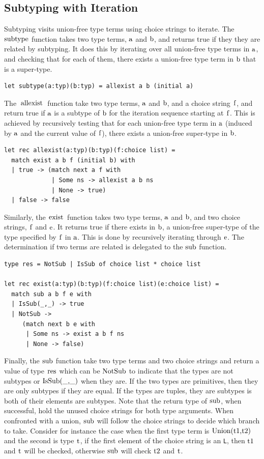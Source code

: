 \documentclass[a4paper,english]{lipics-v2019}
\renewcommand{\L}{{\tt L}\xspace}
\renewcommand{\c}[1]{\ensuremath{\text{\lstinline{#1}}}\xspace}
\begin{document}
\subsection{Subtyping with Iteration}

Subtyping visits union-free type terms using choice strings to iterate.  The
\c{subtype} function takes two type terms, \c a and \c b, and returns true
if they they are related by subtyping. It does this by iterating over all
union-free type terms in \c a, and checking that for each of them, there
exists a union-free type term in \c b that is a super-type.

\begin{lstlisting}
let subtype(a:typ)(b:typ) = allexist a b (initial a)
\end{lstlisting}

The \c{allexist} function take two type terms, \c a and \c b, and a choice
string \c f, and return true if \c a is a subtype of \c b for the iteration
sequence starting at \c f. This is achieved by recursively testing that for
each union-free type term in \c a (induced by \c a and the current value of
\c f), there exists a union-free super-type in \c b.

\begin{lstlisting}
let rec allexist(a:typ)(b:typ)(f:choice list) =
  match exist a b f (initial b) with 
  | true -> (match next a f with
             | Some ns -> allexist a b ns 
             | None -> true) 
  | false -> false
\end{lstlisting}

Similarly, the \c{exist} function takes two type terms, \c a and \c b, and
two choice strings, \c f and \c e. It returns true if there exists in \c b, a
union-free super-type of the type specified by \c f in \c a. This is done by
recursively iterating through \c e. The determination if two terms are
related is delegated to the \c{sub} function.

\begin{lstlisting}
type res = NotSub | IsSub of choice list * choice list

let rec exist(a:typ)(b:typ)(f:choice list)(e:choice list) =
  match sub a b f e with 
  | IsSub(_,_) -> true 
  | NotSub -> 
     (match next b e with
      | Some ns -> exist a b f ns 
      | None -> false) 
\end{lstlisting}

Finally, the \c{sub} function take two type terms and two choice strings and
return a value of type \c{res} which can be \c{NotSub} to indicate that the
types are not subtypes or \c{IsSub(_,_)} when they are.  If the two types
are primitives, then they are only subtypes if they are equal.  If the types
are tuples, they are subtypes is both of their elements are subtypes. Note
that the return type of \c{sub}, when successful, hold the unused choice
strings for both type arguments. When confronted with a union, \c{sub} will
follow the choice strings to decide which branch to take. Consider for
instance the case when the first type term is \c{Union(t1,t2)} and the
second is type \c{t}, if the first element of the choice string is an \L,
then \c{t1} and \c{t} will be checked, otherwise \c{sub} will check \c{t2}
and \c{t}.
\end{document}
